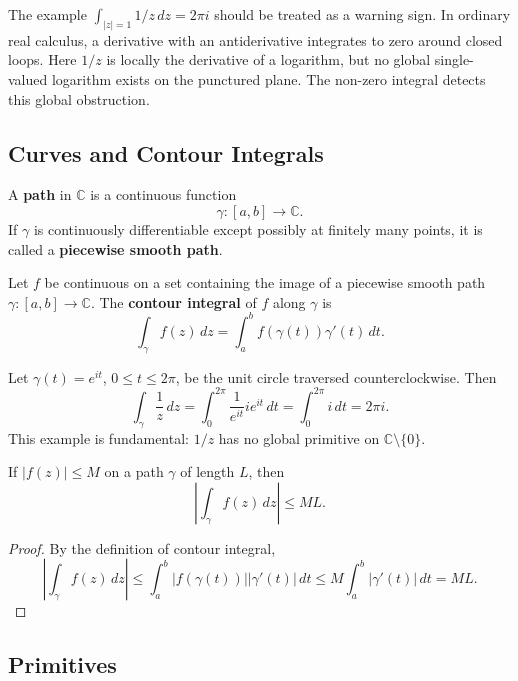The example $\int_{|z|=1}1/z\,dz=2\pi i$ should be treated as a warning sign. In ordinary real calculus, a derivative with an antiderivative integrates to zero around closed loops. Here $1/z$ is locally the derivative of a logarithm, but no global single-valued logarithm exists on the punctured plane. The non-zero integral detects this global obstruction.

\subsection{Curves and Contour Integrals}

\begin{definition}[Path]
A \textbf{path} in $\mathbb{C}$ is a continuous function
\[
    \gamma:[a,b]\to\mathbb{C}.
\]
If $\gamma$ is continuously differentiable except possibly at finitely many points, it is called a \textbf{piecewise smooth path}.
\end{definition}

\begin{definition}
Let $f$ be continuous on a set containing the image of a piecewise smooth path $\gamma:[a,b]\to\mathbb{C}$. The \textbf{contour integral} of $f$ along $\gamma$ is
\[
    \int_\gamma f(z)\,dz=\int_a^b f(\gamma(t))\gamma'(t)\,dt.
\]
\end{definition}

\begin{example}
Let $\gamma(t)=e^{it}$, $0\leq t\leq 2\pi$, be the unit circle traversed counterclockwise. Then
\[
    \int_\gamma \frac{1}{z}\,dz
    =\int_0^{2\pi}\frac{1}{e^{it}}ie^{it}\,dt
    =\int_0^{2\pi} i\,dt
    =2\pi i.
\]
This example is fundamental: $1/z$ has no global primitive on $\mathbb{C}\setminus\{0\}$.
\end{example}

\begin{proposition}
If $|f(z)|\leq M$ on a path $\gamma$ of length $L$, then
\[
    \left|\int_\gamma f(z)\,dz\right|\leq ML.
\]
\end{proposition}

\begin{proof}
By the definition of contour integral,
\[
    \left|\int_\gamma f(z)\,dz\right|
    \leq \int_a^b |f(\gamma(t))||\gamma'(t)|\,dt
    \leq M\int_a^b|\gamma'(t)|\,dt=ML.
\]
\end{proof}

\subsection{Primitives}


